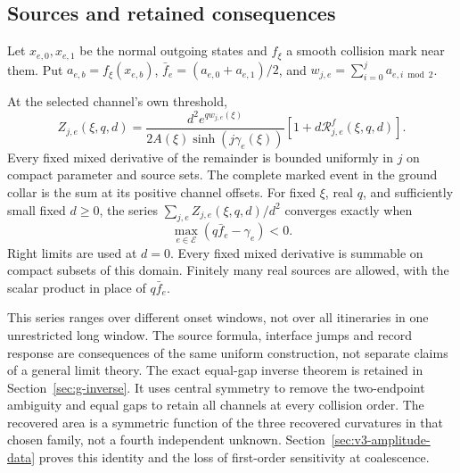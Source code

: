 \subsection{Sources and retained consequences}
Let $x_{e,0},x_{e,1}$ be the normal outgoing states and $f_\xi$ a smooth
collision mark near them. Put $a_{e,b}=f_\xi(x_{e,b})$,
$\bar f_e=(a_{e,0}+a_{e,1})/2$, and
$w_{j,e}=\sum_{i=0}^j a_{e,i\bmod2}$.
\begin{theorem}
\label{thm:g-marked}
At the selected channel's own threshold,
\begin{equation}\label{eq:g-marked}
 Z_{j,e}(\xi,q,d)=
 \frac{d^2e^{qw_{j,e}(\xi)}}{2A(\xi)\sinh(j\gamma_e(\xi))}
       [1+d\mathcal R^f_{j,e}(\xi,q,d)].
\end{equation}
Every fixed mixed derivative of the remainder is bounded uniformly in
$j$ on compact parameter and source sets. The complete marked event in
the ground collar is the sum at its positive channel offsets. For fixed
$\xi$, real $q$, and sufficiently small fixed $d\ge0$, the series
$\sum_{j,e}Z_{j,e}(\xi,q,d)/d^2$ converges exactly when
\begin{equation}\label{eq:g-source-domain}
           \max_{e\in\mathcal E}(q\bar f_e-\gamma_e)<0.
\end{equation}
Right limits are used at $d=0$. Every fixed mixed derivative is summable
on compact subsets of this domain. Finitely many real sources are
allowed, with the scalar product in place of $q\bar f_e$.
\end{theorem}

This series ranges over different onset windows, not over all
itineraries in one unrestricted long window. The source formula,
interface jumps and record response are consequences of the same
uniform construction, not separate claims of a general limit theory.
The exact equal-gap inverse theorem is retained in
Section~\ref{sec:g-inverse}. It uses central symmetry to remove the
two-endpoint ambiguity and equal gaps to retain all channels at every
collision order. The recovered area is a symmetric function of the
three recovered curvatures in that chosen family, not a fourth
independent unknown. Section~\ref{sec:v3-amplitude-data} proves this
identity and the loss of first-order sensitivity at coalescence.

